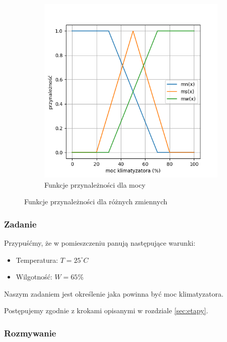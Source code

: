 \documentclass{article}
\begin{document}
\begin{figure}[H]
    \vspace{1cm}
    
    \begin{subfigure}{0.45\textwidth}
        \centering
        \includegraphics[width=\linewidth]{Zad1/mn_ms_mw.png}
        \caption{Funkcje przynależności dla mocy}
    \end{subfigure}
    \caption{Funkcje przynależności dla różnych zmiennych}
\end{figure}

\subsubsection{Zadanie}

Przypuśćmy, że w pomieszczeniu panują następujące warunki:
\begin{itemize}
    \item Temperatura: $T = 25 ^\circ C$
    \item Wilgotność: $W = 65 \%$
\end{itemize}
Naszym zadaniem jest określenie jaka powinna być moc klimatyzatora.

Postępujemy zgodnie z krokami opisanymi w rozdziale \ref{sec:etapy}.

\subsubsection*{Rozmywanie}
\end{document}
